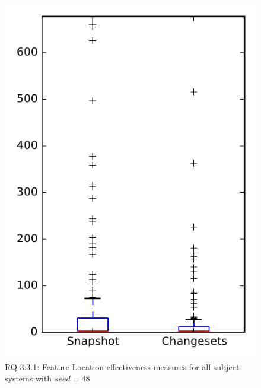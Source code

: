 
\begin{figure}
\centering
\includegraphics[height=0.4\textheight]{figures/flt_seed/rq1_overview_48}
\caption{RQ 3.3.1: Feature Location effectiveness measures for all subject systems with $seed=48$}
\label{fig:flt_seed:rq1:overview}
\end{figure}
